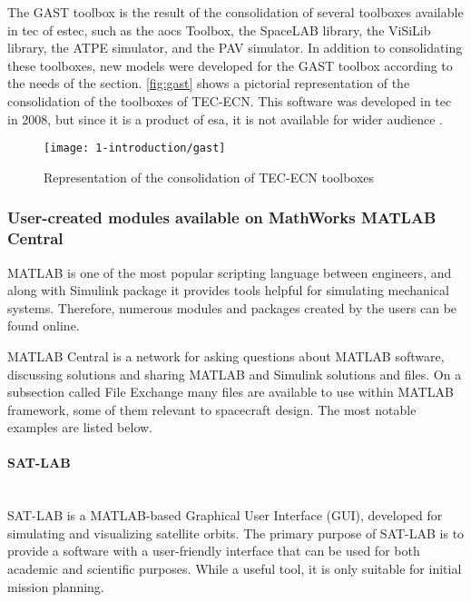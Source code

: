         The GAST toolbox is the result of the consolidation of several toolboxes available in \ac{tec} of \ac{estec}, such as the \ac{aocs} Toolbox, the SpaceLAB library, the ViSiLib library, the ATPE simulator, and the PAV simulator. In addition to consolidating these toolboxes, new models were developed\break
        \clearpage        
        for the GAST toolbox according to the needs of the section. \autoref{fig:gast} shows a pictorial representation of the consolidation of the toolboxes of TEC-ECN. This software was developed in \ac{tec} in 2008, but since it is a product of \ac{esa}, it is not available for wider audience \cite{gast}.
        \vfill  
        \begin{figure}[H]
            \centering
            \texttt{[image: 1-introduction/gast]}
            \caption{Representation of the consolidation of TEC-ECN toolboxes}
            \label{fig:gast}
        \end{figure}
        \vfill
        \vfill

    \subsubsection{User-created modules available on MathWorks MATLAB Central}
    
    MATLAB is one of the most popular scripting language between engineers, and along with Simulink package it provides tools helpful for simulating mechanical systems. Therefore, numerous modules and packages created by the users can be found online.
    
    MATLAB Central is a network for asking questions about MATLAB software, discussing solutions and sharing MATLAB and Simulink solutions and files\cite{matlabcentral}. On a subsection called File Exchange many files are available to use within MATLAB framework, some of them relevant to spacecraft design. The most notable examples are listed below.
    \clearpage

        \paragraph*{SAT-LAB}\hspace{0pt}\\[0.1cm]
            SAT-LAB is a MATLAB-based Graphical User Interface (GUI), developed for simulating and visualizing satellite orbits. The primary purpose of SAT-LAB is to provide a software with a user-friendly interface that can be used for both academic and scientific purposes. While a useful tool, it is only suitable for initial mission planning\cite{satlab}.

